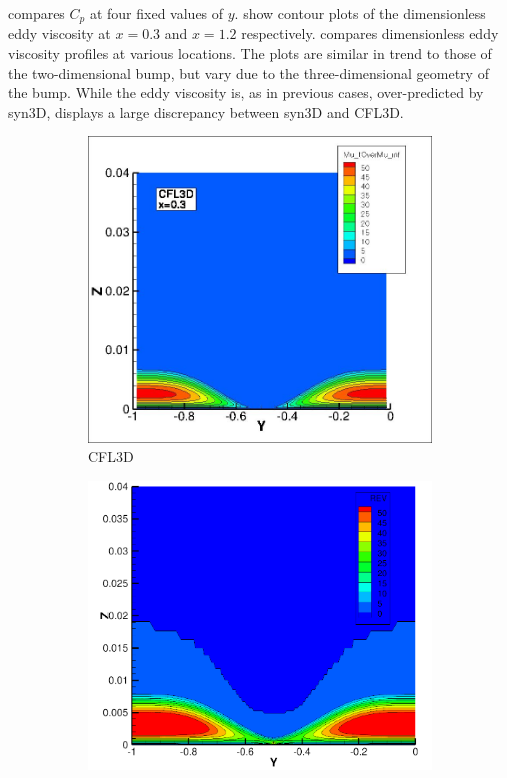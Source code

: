  compares $C_p$ at four fixed values of $y$.  show contour plots of the dimensionless eddy viscosity at $x=0.3$ and $x=1.2$ respectively.  compares dimensionless eddy viscosity profiles at various locations. The plots are similar in trend to those of the two-dimensional bump, but vary due to the three-dimensional geometry of the bump. While the eddy viscosity is, as in previous cases, over-predicted by syn3D,  displays a large discrepancy between syn3D and CFL3D. 

\begin{figure}[ht!]
\centering
\begin{subfigure}{.45\textwidth}
  \centering
  \includegraphics[width=1.0\textwidth]{figs/3dbump/mut_03_cfl3d.jpg}
  \caption{CFL3D}
\end{subfigure}%
\begin{subfigure}{.45\textwidth}
  \centering
  \includegraphics[width=1.0\textwidth]{figs/3dbump/x03Rev.png}

\end{subfigure}
\end{figure}
